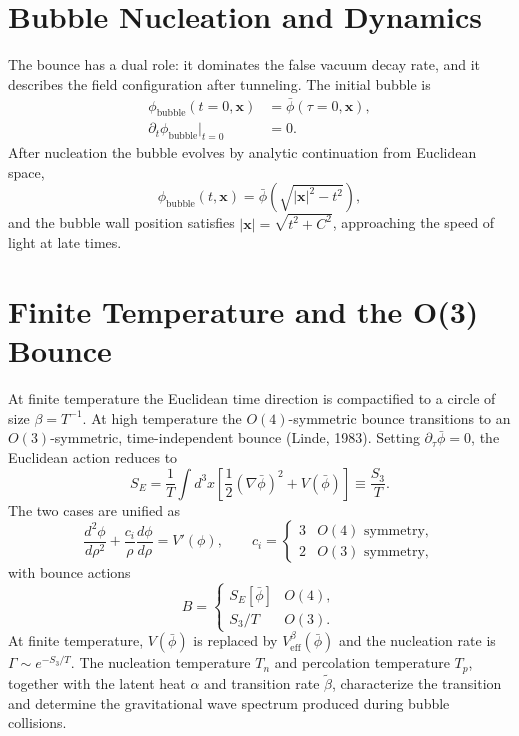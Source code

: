 \section{Bubble Nucleation and Dynamics}

The bounce has a dual role: it dominates the false vacuum decay rate,
and it describes the field configuration after tunneling. The initial
bubble is
\begin{align}
	\phi_{\text{bubble}}(t=0,\mathbf{x})
	                                          & = \bar\phi(\tau=0,\mathbf{x}), \\
	\partial_t\phi_{\text{bubble}}\big|_{t=0} & = 0.
\end{align}
After nucleation the bubble evolves by analytic continuation from
Euclidean space,
\begin{equation}
	\phi_{\text{bubble}}(t,\mathbf{x})
	= \bar\phi\left(\sqrt{|\mathbf{x}|^2 - t^2}\right),
\end{equation}
and the bubble wall position satisfies
$|\mathbf{x}| = \sqrt{t^2 + C^2}$, approaching the speed of light at
late times.

\section{Finite Temperature and the O(3) Bounce}

At finite temperature the Euclidean time direction is compactified to
a circle of size $\beta = T^{-1}$. At high temperature the
$O(4)$-symmetric bounce transitions to an $O(3)$-symmetric,
time-independent bounce (Linde, 1983). Setting
$\partial_\tau\bar\phi = 0$, the Euclidean action reduces to
\begin{equation}
	S_E = \frac{1}{T}\int d^3x\left[
		\frac{1}{2}(\nabla\bar\phi)^2 + V(\bar\phi)\right]
	\equiv \frac{S_3}{T}.
\end{equation}
The two cases are unified as
\begin{equation}
	\frac{d^2\phi}{d\rho^2}
	+ \frac{c_i}{\rho}\frac{d\phi}{d\rho} = V'(\phi),
	\qquad c_i = \begin{cases}
		3 & O(4)\text{ symmetry}, \\
		2 & O(3)\text{ symmetry},
	\end{cases}
\end{equation}
with bounce actions
\begin{equation}
	B = \begin{cases}
		S_E[\bar\phi] & O(4), \\
		S_3/T         & O(3).
	\end{cases}
\end{equation}
At finite temperature, $V(\bar\phi)$ is replaced by
$V_{\text{eff}}^\beta(\bar\phi)$ and the nucleation rate is
$\Gamma \sim e^{-S_3/T}$. The nucleation temperature $T_n$ and
percolation temperature $T_p$, together with the latent heat $\alpha$
and transition rate $\tilde\beta$, characterize the transition and
determine the gravitational wave spectrum produced during bubble
collisions.
